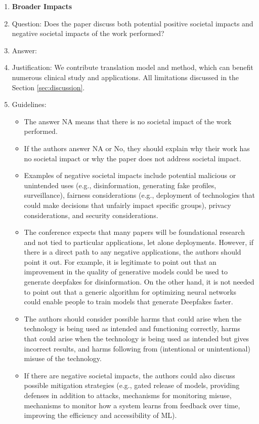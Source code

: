 \documentclass{article}
\begin{document}
\begin{enumerate}
\item {\bf Broader Impacts}
    \item[] Question: Does the paper discuss both potential positive societal impacts and negative societal impacts of the work performed?
    \item[] Answer: \answerYes{}{} %
    \item[] Justification: We contribute translation model and method, which can benefit numerous clinical study and applications. All limitations discussed in the Section \ref{sec:discussion}.
    \item[] Guidelines:
    \begin{itemize}
        \item The answer NA means that there is no societal impact of the work performed.
        \item If the authors answer NA or No, they should explain why their work has no societal impact or why the paper does not address societal impact.
        \item Examples of negative societal impacts include potential malicious or unintended uses (e.g., disinformation, generating fake profiles, surveillance), fairness considerations (e.g., deployment of technologies that could make decisions that unfairly impact specific groups), privacy considerations, and security considerations.
        \item The conference expects that many papers will be foundational research and not tied to particular applications, let alone deployments. However, if there is a direct path to any negative applications, the authors should point it out. For example, it is legitimate to point out that an improvement in the quality of generative models could be used to generate deepfakes for disinformation. On the other hand, it is not needed to point out that a generic algorithm for optimizing neural networks could enable people to train models that generate Deepfakes faster.
        \item The authors should consider possible harms that could arise when the technology is being used as intended and functioning correctly, harms that could arise when the technology is being used as intended but gives incorrect results, and harms following from (intentional or unintentional) misuse of the technology.
        \item If there are negative societal impacts, the authors could also discuss possible mitigation strategies (e.g., gated release of models, providing defenses in addition to attacks, mechanisms for monitoring misuse, mechanisms to monitor how a system learns from feedback over time, improving the efficiency and accessibility of ML).
    \end{itemize}
    

\end{enumerate}
\end{document}
